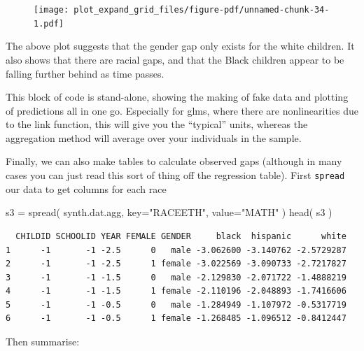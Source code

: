\documentclass[
  letterpaper,
  DIV=11,
  numbers=noendperiod]{scrreprt}
\newenvironment{Shaded}{\begin{snugshade}}{\end{snugshade}}
\newcommand{\AttributeTok}[1]{\textcolor[rgb]{0.49,0.56,0.16}{#1}}
\newcommand{\FunctionTok}[1]{\textcolor[rgb]{0.02,0.16,0.49}{#1}}
\newcommand{\NormalTok}[1]{\textcolor[rgb]{0.00,0.44,0.13}{#1}}
\newcommand{\OtherTok}[1]{\textcolor[rgb]{0.00,0.44,0.13}{#1}}
\newcommand{\StringTok}[1]{\textcolor[rgb]{0.25,0.44,0.63}{#1}}
\begin{document}
\begin{figure}[H]

{\centering \texttt{[image: plot\_expand\_grid\_files/figure-pdf/unnamed-chunk-34-1.pdf]}

}

\end{figure}

The above plot suggests that the gender gap only exists for the white
children. It also shows that there are racial gaps, and that the Black
children appear to be falling further behind as time passes.

This block of code is stand-alone, showing the making of fake data and
plotting of predictions all in one go. Especially for glms, where there
are nonlinearities due to the link function, this will give you the
``typical'' units, whereas the aggregation method will average over your
individuals in the sample.

Finally, we can also make tables to calculate observed gaps (although in
many cases you can just read this sort of thing off the regression
table). First \texttt{spread} our data to get columns for each race

\begin{Shaded}
\begin{Highlighting}[]
\NormalTok{s3 }\OtherTok{=} \FunctionTok{spread}\NormalTok{( synth.dat.agg, }\AttributeTok{key=}\StringTok{"RACEETH"}\NormalTok{, }\AttributeTok{value=}\StringTok{"MATH"}\NormalTok{ )}
\FunctionTok{head}\NormalTok{( s3 )}
\end{Highlighting}
\end{Shaded}

\begin{verbatim}
  CHILDID SCHOOLID YEAR FEMALE GENDER     black  hispanic      white
1      -1       -1 -2.5      0   male -3.062600 -3.140762 -2.5729287
2      -1       -1 -2.5      1 female -3.022569 -3.090733 -2.7217827
3      -1       -1 -1.5      0   male -2.129830 -2.071722 -1.4888219
4      -1       -1 -1.5      1 female -2.110196 -2.048893 -1.7416606
5      -1       -1 -0.5      0   male -1.284949 -1.107972 -0.5317719
6      -1       -1 -0.5      1 female -1.268485 -1.096512 -0.8412447
\end{verbatim}

Then summarise:
\end{document}
